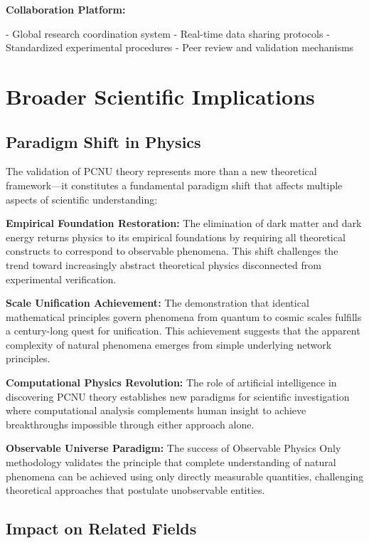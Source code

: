 \documentclass[11pt,a4paper]{article}
\begin{document}
\textbf{Collaboration Platform:}

- Global research coordination system
- Real-time data sharing protocols
- Standardized experimental procedures
- Peer review and validation mechanisms

\section{Broader Scientific Implications}

\subsection{Paradigm Shift in Physics}

The validation of PCNU theory represents more than a new theoretical framework—it constitutes a fundamental paradigm shift that affects multiple aspects of scientific understanding:

\textbf{Empirical Foundation Restoration:}
The elimination of dark matter and dark energy returns physics to its empirical foundations by requiring all theoretical constructs to correspond to observable phenomena. This shift challenges the trend toward increasingly abstract theoretical physics disconnected from experimental verification.

\textbf{Scale Unification Achievement:}
The demonstration that identical mathematical principles govern phenomena from quantum to cosmic scales fulfills a century-long quest for unification. This achievement suggests that the apparent complexity of natural phenomena emerges from simple underlying network principles.

\textbf{Computational Physics Revolution:}
The role of artificial intelligence in discovering PCNU theory establishes new paradigms for scientific investigation where computational analysis complements human insight to achieve breakthroughs impossible through either approach alone.

\textbf{Observable Universe Paradigm:}
The success of Observable Physics Only methodology validates the principle that complete understanding of natural phenomena can be achieved using only directly measurable quantities, challenging theoretical approaches that postulate unobservable entities.

\subsection{Impact on Related Fields}
\end{document}
